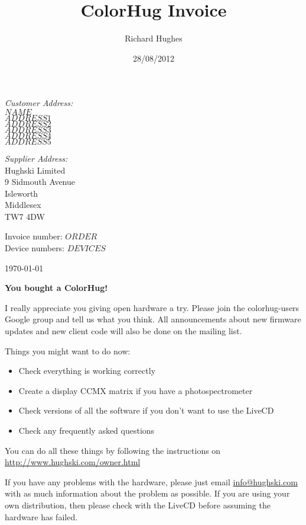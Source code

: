 \documentclass[a4paper,10pt,oneside]{letter}
\author{Richard Hughes}
\title{ColorHug Invoice}
\date{28/08/2012}
\begin{document}
\large
\renewcommand{\arraystretch}{1.5}

\begin{minipage}[t]{4in}
\textit{Customer Address:}\\
$NAME$\\
$ADDRESS1$\\
$ADDRESS2$\\
$ADDRESS3$\\
$ADDRESS4$\\
$ADDRESS5$\\
\end{minipage}
\begin{minipage}[t]{2in}
\textit{Supplier Address:}\\
Hughski Limited\\
9 Sidmouth Avenue\\
Isleworth\\
Middlesex\\
TW7 4DW
\end{minipage}

Invoice number: \texttt{$ORDER$}\\
Device numbers: \texttt{$DEVICES$}

\begin{flushright}
 \today
\end{flushright}

\textbf{You bought a ColorHug!}

I really appreciate you giving open hardware a try. Please join the colorhug-users Google group and tell us what you think. All announcements about new firmware updates and new client code will also be done on the mailing list.

Things you might want to do now:

\begin{itemize}
\item Check everything is working correctly
\item Create a display CCMX matrix if you have a photospectrometer
\item Check versions of all the software if you don't want to use the LiveCD
\item Check any frequently asked questions
\end{itemize}

You can do all these things by following the instructions on \\\url{http://www.hughski.com/owner.html}

If you have any problems with the hardware, please just email \url{info@hughski.com} with as much information about the problem as possible. If you are using your own distribution, then please check with the LiveCD before assuming the hardware has failed.
\end{document}
